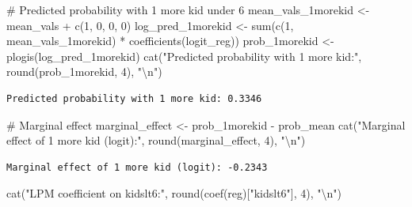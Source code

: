 \documentclass[
  letterpaper,
  DIV=11,
  numbers=noendperiod]{scrreprt}
\newenvironment{Shaded}{\begin{snugshade}}{\end{snugshade}}
\newcommand{\CommentTok}[1]{\textcolor[rgb]{0.37,0.37,0.37}{#1}}
\newcommand{\DecValTok}[1]{\textcolor[rgb]{0.68,0.00,0.00}{#1}}
\newcommand{\FunctionTok}[1]{\textcolor[rgb]{0.28,0.35,0.67}{#1}}
\newcommand{\NormalTok}[1]{\textcolor[rgb]{0.00,0.23,0.31}{#1}}
\newcommand{\OtherTok}[1]{\textcolor[rgb]{0.00,0.23,0.31}{#1}}
\newcommand{\SpecialCharTok}[1]{\textcolor[rgb]{0.37,0.37,0.37}{#1}}
\newcommand{\StringTok}[1]{\textcolor[rgb]{0.13,0.47,0.30}{#1}}
\begin{document}
\begin{Shaded}
\begin{Highlighting}[]
\CommentTok{\# Predicted probability with 1 more kid under 6}
\NormalTok{mean\_vals\_1morekid }\OtherTok{\textless{}{-}}\NormalTok{ mean\_vals }\SpecialCharTok{+} \FunctionTok{c}\NormalTok{(}\DecValTok{1}\NormalTok{, }\DecValTok{0}\NormalTok{, }\DecValTok{0}\NormalTok{, }\DecValTok{0}\NormalTok{)}
\NormalTok{log\_pred\_1morekid }\OtherTok{\textless{}{-}} \FunctionTok{sum}\NormalTok{(}\FunctionTok{c}\NormalTok{(}\DecValTok{1}\NormalTok{, mean\_vals\_1morekid) }\SpecialCharTok{*} \FunctionTok{coefficients}\NormalTok{(logit\_reg))}
\NormalTok{prob\_1morekid }\OtherTok{\textless{}{-}} \FunctionTok{plogis}\NormalTok{(log\_pred\_1morekid)}
\FunctionTok{cat}\NormalTok{(}\StringTok{"Predicted probability with 1 more kid:"}\NormalTok{, }\FunctionTok{round}\NormalTok{(prob\_1morekid, }\DecValTok{4}\NormalTok{), }\StringTok{"}\SpecialCharTok{\textbackslash{}n}\StringTok{"}\NormalTok{)}
\end{Highlighting}
\end{Shaded}

\begin{verbatim}
Predicted probability with 1 more kid: 0.3346 
\end{verbatim}

\begin{Shaded}
\begin{Highlighting}[]
\CommentTok{\# Marginal effect}
\NormalTok{marginal\_effect }\OtherTok{\textless{}{-}}\NormalTok{ prob\_1morekid }\SpecialCharTok{{-}}\NormalTok{ prob\_mean}
\FunctionTok{cat}\NormalTok{(}\StringTok{"Marginal effect of 1 more kid (logit):"}\NormalTok{, }\FunctionTok{round}\NormalTok{(marginal\_effect, }\DecValTok{4}\NormalTok{), }\StringTok{"}\SpecialCharTok{\textbackslash{}n}\StringTok{"}\NormalTok{)}
\end{Highlighting}
\end{Shaded}

\begin{verbatim}
Marginal effect of 1 more kid (logit): -0.2343 
\end{verbatim}

\begin{Shaded}
\begin{Highlighting}[]
\FunctionTok{cat}\NormalTok{(}\StringTok{"LPM coefficient on kidslt6:"}\NormalTok{, }\FunctionTok{round}\NormalTok{(}\FunctionTok{coef}\NormalTok{(reg)[}\StringTok{"kidslt6"}\NormalTok{], }\DecValTok{4}\NormalTok{), }\StringTok{"}\SpecialCharTok{\textbackslash{}n}\StringTok{"}\NormalTok{)}
\end{Highlighting}
\end{Shaded}
\end{document}
